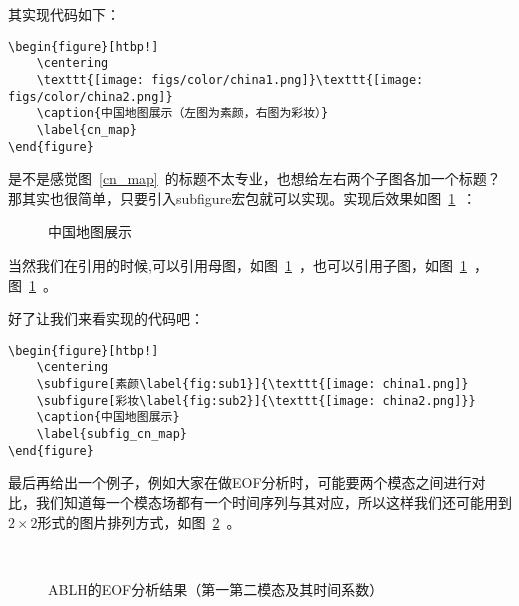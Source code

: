 其实现代码如下：

{
\color{green!50!black}
\begin{lstlisting}[breaklines=true,]
\begin{figure}[htbp!]
    \centering
    \texttt{[image: figs/color/china1.png]}\texttt{[image: figs/color/china2.png]}
    \caption{中国地图展示（左图为素颜，右图为彩妆）}
    \label{cn_map}
\end{figure}
\end{lstlisting}
}

是不是感觉图~\ref{cn_map}~的标题不太专业，也想给左右两个子图各加一个标题？那其实也很简单，只要引入subfigure宏包就可以实现。实现后效果如图~\ref{subfig_cn_map}~：

\begin{figure}[htbp!]
    \centering
    \caption{中国地图展示}
    \label{subfig_cn_map}
\end{figure}

当然我们在引用的时候,可以引用母图，如图~\ref{subfig_cn_map}~，也可以引用子图，如图~\ref{subfig_cn_map}~，图~\ref{subfig_cn_map}~。

好了让我们来看实现的代码吧：

{
\color{green!50!black}
\begin{lstlisting}[breaklines=true,]
\begin{figure}[htbp!]
    \centering
    \subfigure[素颜\label{fig:sub1}]{\texttt{[image: china1.png]}
    \subfigure[彩妆\label{fig:sub2}]{\texttt{[image: china2.png]}}
    \caption{中国地图展示}
    \label{subfig_cn_map}
\end{figure}
\end{lstlisting}
}

最后再给出一个例子，例如大家在做EOF分析时，可能要两个模态之间进行对比，我们知道每一个模态场都有一个时间序列与其对应，所以这样我们还可能用到$2\times 2$形式的图片排列方式，如图~\ref{fig:eof_12}~。

\begin{figure}[htbp]
    \center
    \\
    \caption{ABLH的EOF分析结果（第一第二模态及其时间系数）}\label{fig:eof_12}
\end{figure}

